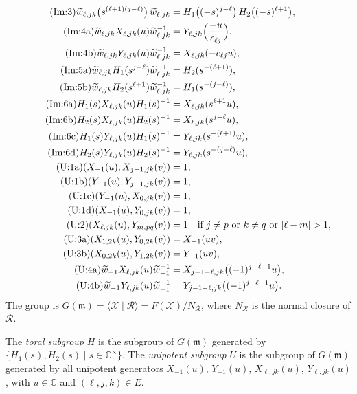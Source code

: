 \documentclass[11pt]{article}
\theoremstyle{definition}
\theoremstyle{remark}
\newcommand{\C}{\mathbb{C}}
\newcommand{\cX}{\mathcal{X}}
\newcommand{\cR}{\mathcal{R}}
\begin{document}
\begin{align*}
\tag{Im:3} \widetilde w_{\ell,jk}\bigl(s^{(\ell+1)(j-\ell)}\bigr)\,\widetilde w_{\ell,jk}&=H_1\bigl((-s)^{j-\ell}\bigr)\,H_2\bigl((-s)^{\ell+1}\bigr),\\
\tag{Im:4a} \widetilde w_{\ell,jk}X_{\ell,jk}(u)\widetilde w_{\ell,jk}^{-1}&=Y_{\ell,jk}\Bigl(\frac{-u}{c_{\ell j}}\Bigr),\\
\tag{Im:4b} \widetilde w_{\ell,jk}Y_{\ell,jk}(u)\widetilde w_{\ell,jk}^{-1}&=X_{\ell,jk}(-c_{\ell j}u),\\
\tag{Im:5a} \widetilde w_{\ell,jk}H_1(s^{j-\ell})\widetilde w_{\ell,jk}^{-1}&=H_2(s^{-(\ell+1)}),\\
\tag{Im:5b} \widetilde w_{\ell,jk}H_2(s^{\ell+1})\widetilde w_{\ell,jk}^{-1}&=H_1(s^{-(j-\ell)}),\\
\tag{Im:6a} H_1(s)X_{\ell,jk}(u)H_1(s)^{-1}&=X_{\ell,jk}(s^{\ell+1}u),\\
\tag{Im:6b} H_2(s)X_{\ell,jk}(u)H_2(s)^{-1}&=X_{\ell,jk}(s^{j-\ell}u),\\
\tag{Im:6c} H_1(s)Y_{\ell,jk}(u)H_1(s)^{-1}&=Y_{\ell,jk}(s^{-(\ell+1)}u),\\
\tag{Im:6d} H_2(s)Y_{\ell,jk}(u)H_2(s)^{-1}&=Y_{\ell,jk}(s^{-(j-\ell)}u),\\
\tag{U:1a} (X_{-1}(u),X_{j-1,jk}(v))&=1,\\
\tag{U:1b} (Y_{-1}(u),Y_{j-1,jk}(v))&=1,\\
\tag{U:1c} (Y_{-1}(u),X_{0,jk}(v))&=1,\\
\tag{U:1d} (X_{-1}(u),Y_{0,jk}(v))&=1,\\
\tag{U:2} (X_{\ell,jk}(u),Y_{m,pq}(v))&=1\quad\text{if } j\ne p \text{ or } k\ne q \text{ or } |\ell-m|>1,\\
\tag{U:3a} (X_{1,2k}(u),Y_{0,2k}(v))&=X_{-1}(uv),\\
\tag{U:3b} (X_{0,2k}(u),Y_{1,2k}(v))&=Y_{-1}(uv),\\
\tag{U:4a} \widetilde w_{-1}X_{\ell,jk}(u)\widetilde w_{-1}^{-1}&=X_{j-1-\ell,jk}\bigl((-1)^{j-\ell-1}u\bigr),\\
\tag{U:4b} \widetilde w_{-1}Y_{\ell,jk}(u)\widetilde w_{-1}^{-1}&=Y_{j-1-\ell,jk}\bigl((-1)^{j-\ell-1}u\bigr).
\end{align*}
\endgroup
The group is $G(\mathfrak m)=\langle\cX\mid\cR\rangle=F(\cX)/N_\cR$, where $N_\cR$ is the normal closure of $\cR$.

The \emph{toral subgroup} $H$ is the subgroup of $G(\mathfrak m)$ generated by $\{H_1(s),H_2(s)\mid s\in\C^\times\}$. The \emph{unipotent subgroup} $U$ is the subgroup of $G(\mathfrak m)$ generated by all unipotent generators $X_{-1}(u)$, $Y_{-1}(u)$, $X_{\ell,jk}(u)$, $Y_{\ell,jk}(u)$, with $u\in\C$ and $(\ell,j,k)\in E$.
\end{document}
